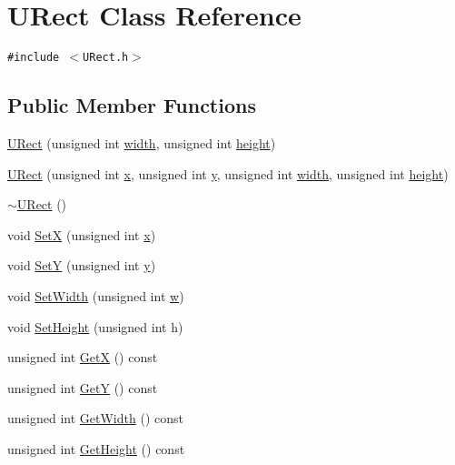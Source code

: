 \hypertarget{class_u_rect}{
\section{URect Class Reference}
\label{class_u_rect}
}
{\tt \#include $<$URect.h$>$}

\subsection*{Public Member Functions}
\begin{CompactItemize}
\item 
\hyperlink{class_u_rect_8f6475f6ae283b8ce64c0d90dbdf3f4f}{URect} (unsigned int \hyperlink{wglext_8h_e6531b1788ca42a9ae8155b0c52e7630}{width}, unsigned int \hyperlink{wglext_8h_b2e63df950c3789599e1e43f477bc9e3}{height})
\item 
\hyperlink{class_u_rect_5eb595be310fb38697065af3c76bfbfd}{URect} (unsigned int \hyperlink{wglext_8h_d77deca22f617d3f0e0eb786445689fc}{x}, unsigned int \hyperlink{wglext_8h_9298c7ad619074f5285b32c6b72bfdea}{y}, unsigned int \hyperlink{wglext_8h_e6531b1788ca42a9ae8155b0c52e7630}{width}, unsigned int \hyperlink{wglext_8h_b2e63df950c3789599e1e43f477bc9e3}{height})
\item 
\hyperlink{class_u_rect_752806b5a4e2dd3d43225837e85b0ae6}{$\sim$URect} ()
\item 
void \hyperlink{class_u_rect_e19515cfb7872b5b27bede7f489a520c}{SetX} (unsigned int \hyperlink{wglext_8h_d77deca22f617d3f0e0eb786445689fc}{x})
\item 
void \hyperlink{class_u_rect_53c87d408173afc96a8f60aa300527a0}{SetY} (unsigned int \hyperlink{wglext_8h_9298c7ad619074f5285b32c6b72bfdea}{y})
\item 
void \hyperlink{class_u_rect_f63bae9c27394d9dbc7b3e1b8e48c20b}{SetWidth} (unsigned int \hyperlink{glext__bak_8h_d47d000a8e40b26a33682e10ae32a1b6}{w})
\item 
void \hyperlink{class_u_rect_f15b083e8a87b92ee81b3776316464d6}{SetHeight} (unsigned int h)
\item 
unsigned int \hyperlink{class_u_rect_8509dfa3a2850160860dec1e3528b2f7}{GetX} () const 
\item 
unsigned int \hyperlink{class_u_rect_12b0ae4cd0102dacbcc2eb6edad73e47}{GetY} () const 
\item 
unsigned int \hyperlink{class_u_rect_442168d8e32d90f4448e17d5c83ba7b0}{GetWidth} () const 
\item 
unsigned int \hyperlink{class_u_rect_d26d5973be04cc49595281086ac71af9}{GetHeight} () const 
\end{CompactItemize}


